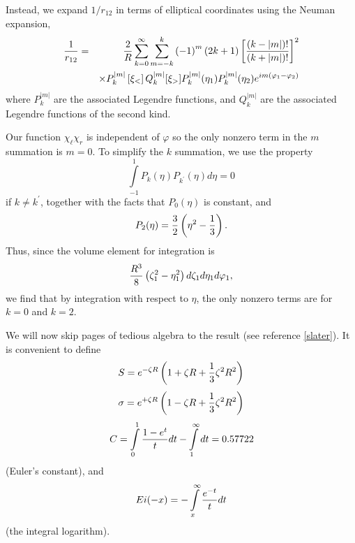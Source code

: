 Instead, we expand $1/r_{12}$ in terms of elliptical coordinates 
using the Neuman expansion,
\begin{eqnarray*}
{1 \over r_{12}} &= & {2 \over R} \sum^{\infty}_{k=0} \sum^{k}_{m=-k} 
\left( - 1 \right)^m \left( 2 k + 1 \right) \left[ {(k-|m|)! \over 
(k+|m|)!} \right]^2\cr
& &\times P^{|m|}_k \left[ \xi_< \right] 
Q^{|m|}_k [\xi_>] P^{|m|}_k (\eta_1) P^{|m|}_k (\eta_2) 
e^{im(\varphi_1 - \varphi_2)}\cr
\end{eqnarray*}
where $P^{|m|}_k$ are the associated Legendre functions, and 
$Q^{|m|}_k$ are the associated Legendre functions of the second kind.
    
Our function $\chi_\ell\chi_r$ is independent of $\varphi$ so the only 
nonzero term in the $m$ summation is $m = 0$. To simplify the $k$ 
summation, we use the property
\begin{equation}
\int\limits^{1}_{-1} P_k ( \eta ) P_{k^{\prime}} ( \eta ) d \eta = 0
\end{equation}
if $k \not= k^{\prime}$, together with the facts that $P_0(\eta)$ is 
constant, and
\begin{equation}
P_2 ( \eta ) = {3 \over 2} \left( \eta^2 - {1 \over 3} \right) .
\end{equation}
Thus, since the volume element for integration is
\begin{equation}
{R^3 \over 8} \left( \zeta^2_1 - \eta^2_1 \right) d \zeta_1 d \eta_1 
d \varphi_1 ,
\end{equation}
we find that by integration with respect to $\eta$, the only nonzero 
terms are for $k = 0$ and $k = 2$.

We will now skip pages of tedious algebra to the result (see reference
\ref{slater}).  It is convenient to define
\begin{equation}
S = e^{-\zeta R} \left( 1 + \zeta R + {1 \over 3} \zeta^2 R^2 \right)
\end{equation}
\begin{equation}
\sigma = e^{+\zeta R} \left( 1 - \zeta R + {1 \over 3} \zeta^2 R^2 
\right)
\end{equation}
\begin{equation}
C = \int\limits^{1}_{0} {1 - e^t \over t} d t - 
\int\limits^{\infty}_{1} d t = 0.57722
\end{equation}
(Euler's constant), and
\begin{equation}
Ei(-x) = - \int\limits^{\infty}_{x} {e^{-t} \over t} dt
\end{equation}
(the integral logarithm).
 
